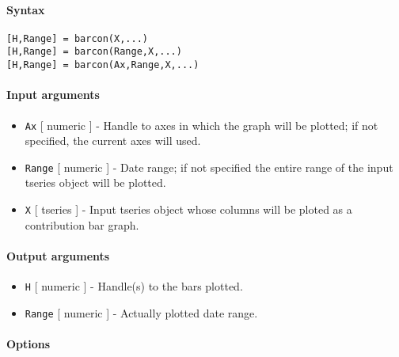 


	\paragraph{Syntax}\label{syntax}

\begin{verbatim}
[H,Range] = barcon(X,...)
[H,Range] = barcon(Range,X,...)
[H,Range] = barcon(Ax,Range,X,...)
\end{verbatim}

\paragraph{Input arguments}\label{input-arguments}

\begin{itemize}
\item
  \texttt{Ax} {[} numeric {]} - Handle to axes in which the graph will
  be plotted; if not specified, the current axes will used.
\item
  \texttt{Range} {[} numeric {]} - Date range; if not specified the
  entire range of the input tseries object will be plotted.
\item
  \texttt{X} {[} tseries {]} - Input tseries object whose columns will
  be ploted as a contribution bar graph.
\end{itemize}

\paragraph{Output arguments}\label{output-arguments}

\begin{itemize}
\item
  \texttt{H} {[} numeric {]} - Handle(s) to the bars plotted.
\item
  \texttt{Range} {[} numeric {]} - Actually plotted date range.
\end{itemize}

\paragraph{Options}\label{options}

